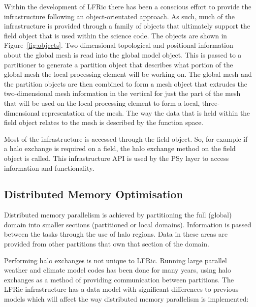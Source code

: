 \documentclass[review,times]{elsarticle}
\begin{document}
Within the development of LFRic there has been a conscious effort to
provide the infrastructure following an object-orientated approach. As
such, much of the infrastructure is provided through a family of
objects that ultimately support the field object that is used within the
science code. The objects are shown in
Figure~\ref{fig:objects}. Two-dimensional topological and positional
information about the global mesh is read into the global model object.
This is passed to a partitioner to generate a partition object that
describes what portion of the global mesh the local processing element
will be working on. The global mesh and the partition objects are then
combined to form a mesh object that extrudes the two-dimensional mesh
information in the vertical for just the part of the mesh that will be
used on the local processing element to form a local, three-dimensional
representation of the mesh. The way the data that is held within the
field object relates to the mesh is described by the function space.

Most of the infrastructure is accessed through the field object. So, for
example if a halo exchange is required on a field, the halo exchange
method on the field object is called. This infrastructure
API is used by the PSy layer to access information and functionality.

\subsection{\label{sec:sub:distmem}Distributed Memory Optimisation}

Distributed memory parallelism is achieved by partitioning the full
(global) domain into smaller sections (partitioned or local domains).
Information is passed between the tasks through the use of halo regions.
Data in these areas are provided from other partitions that own that
section of the domain.

Performing halo exchanges is not unique to LFRic. Running large parallel
weather and climate model codes has been done for many years, using
halo exchanges as a
method of providing communication between partitions. The LFRic
infrastructure has a data model with significant differences to previous
models which will affect the way distributed memory parallelism is
implemented:
\end{document}
